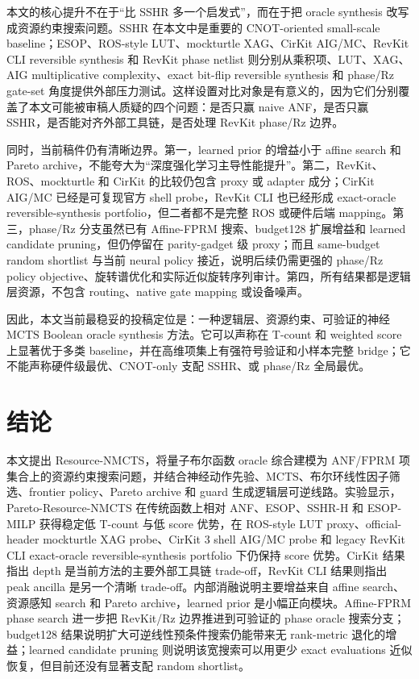 \documentclass[UTF8,fontset=macnew,11pt]{ctexart}
\newcommand{\method}{Resource-NMCTS}
\newcommand{\anf}{\ensuremath{\mathrm{ANF}}}
\newcommand{\fprm}{\ensuremath{\mathrm{FPRM}}}
\newcommand{\mcts}{\ensuremath{\mathrm{MCTS}}}
\begin{document}
本文的核心提升不在于“比 SSHR 多一个启发式”，而在于把 oracle synthesis 改写成资源约束搜索问题。SSHR 在本文中是重要的 CNOT-oriented small-scale baseline；ESOP、ROS-style LUT、mockturtle XAG、CirKit AIG/MC、RevKit CLI reversible synthesis 和 RevKit phase netlist 则分别从乘积项、LUT、XAG、AIG multiplicative complexity、exact bit-flip reversible synthesis 和 phase/Rz gate-set 角度提供外部压力测试。这样设置对比对象是有意义的，因为它们分别覆盖了本文可能被审稿人质疑的四个问题：是否只赢 naive ANF，是否只赢 SSHR，是否能对齐外部工具链，是否处理 RevKit phase/Rz 边界。

同时，当前稿件仍有清晰边界。第一，learned prior 的增益小于 affine search 和 Pareto archive，不能夸大为“深度强化学习主导性能提升”。第二，RevKit、ROS、mockturtle 和 CirKit 的比较仍包含 proxy 或 adapter 成分；CirKit AIG/MC 已经是可复现官方 shell probe，RevKit CLI 也已经形成 exact-oracle reversible-synthesis portfolio，但二者都不是完整 ROS 或硬件后端 mapping。第三，phase/Rz 分支虽然已有 Affine-FPRM 搜索、budget128 扩展增益和 learned candidate pruning，但仍停留在 parity-gadget 级 proxy；而且 same-budget random shortlist 与当前 neural policy 接近，说明后续仍需更强的 phase/Rz policy objective、旋转谱优化和实际近似旋转序列审计。第四，所有结果都是逻辑层资源，不包含 routing、native gate mapping 或设备噪声。

因此，本文当前最稳妥的投稿定位是：一种逻辑层、资源约束、可验证的神经 \mcts{} Boolean oracle synthesis 方法。它可以声称在 T-count 和 weighted score 上显著优于多类 baseline，并在高维项集上有强符号验证和小样本完整 bridge；它不能声称硬件级最优、CNOT-only 支配 SSHR、或 phase/Rz 全局最优。

\section{结论}

本文提出 \method{}，将量子布尔函数 oracle 综合建模为 \anf{}/\fprm{} 项集合上的资源约束搜索问题，并结合神经动作先验、\mcts{}、布尔环线性因子筛选、frontier policy、Pareto archive 和 guard 生成逻辑层可逆线路。实验显示，Pareto-\method{} 在传统函数上相对 ANF、ESOP、SSHR-H 和 ESOP-MILP 获得稳定低 T-count 与低 score 优势，在 ROS-style LUT proxy、official-header mockturtle XAG probe、CirKit 3 shell AIG/MC probe 和 legacy RevKit CLI exact-oracle reversible-synthesis portfolio 下仍保持 score 优势。CirKit 结果指出 depth 是当前方法的主要外部工具链 trade-off，RevKit CLI 结果则指出 peak ancilla 是另一个清晰 trade-off。内部消融说明主要增益来自 affine search、资源感知 search 和 Pareto archive，learned prior 是小幅正向模块。Affine-FPRM phase search 进一步把 RevKit/Rz 边界推进到可验证的 phase oracle 搜索分支；budget128 结果说明扩大可逆线性预条件搜索仍能带来无 rank-metric 退化的增益；learned candidate pruning 则说明该宽搜索可以用更少 exact evaluations 近似恢复，但目前还没有显著支配 random shortlist。
\end{document}
